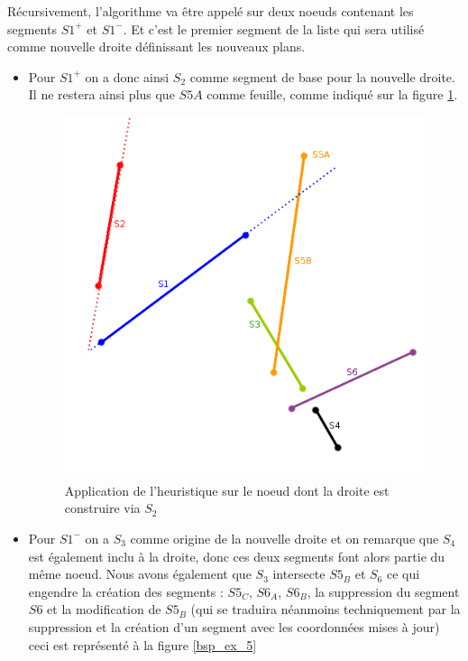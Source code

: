 \documentclass[11pt,a4paper]{article}
\begin{document}
Récursivement, l'algorithme va être appelé sur deux noeuds contenant les segments $S1^+$ et $S1^-$. Et c'est le premier segment de la liste qui sera utilisé comme nouvelle droite définissant les nouveaux plans. 
\begin{itemize}
\item Pour $S1^+$ on a donc ainsi $S_2$ comme segment de base pour la nouvelle droite. Il ne restera ainsi plus que $S5A$ comme feuille, comme indiqué sur la figure \ref{bsp_ex_4}.
\begin{figure}[H]
\centering
\includegraphics[scale=0.6]{bsp_ex_4.png}
\caption{Application de l'heuristique sur le noeud dont la droite est construire via $S_2$}
\label{bsp_ex_4}
\end{figure}

\item Pour $S1^-$ on a $S_3$ comme origine de la nouvelle droite et on remarque que $S_4$ est également inclu à la droite, donc ces deux segments font alors partie du même noeud. Nous avons également que $S_3$ intersecte $S5_B$ et $S_6$ ce qui engendre la création des segments : $S5_C$, $S6_A$, $S6_B$, la suppression du segment $S6$ et la modification de $S5_B$ (qui se traduira néanmoins techniquement par la suppression et la création d'un segment avec les coordonnées mises à jour) ceci est représenté à la figure \ref{bsp_ex_5}
\end{itemize}
\end{document}
